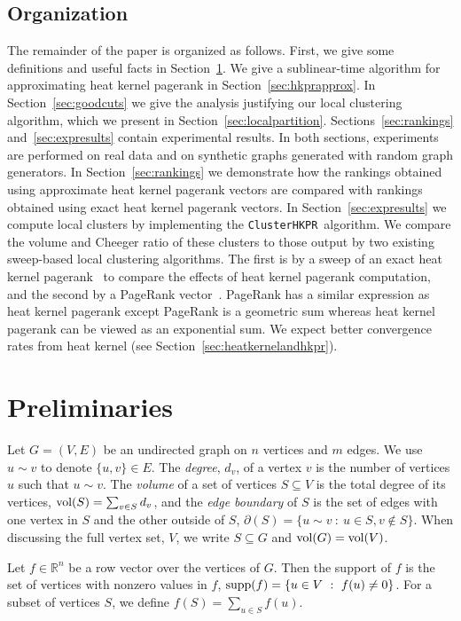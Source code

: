 \documentclass[runningheads,a4paper]{llncs}
\newcommand{\R}{\mathbb{R}}
\newcommand{\vol}{\textmd{vol}}
\newcommand{\supp}{\textmd{supp}}
\newcommand{\partitionalg}{\texttt{ClusterHKPR}}
\begin{document}
\subsection{Organization}
The remainder of the paper is organized as follows.  First, we give some
definitions and useful facts in Section~\ref{sec:preliminaries}.  We give a
sublinear-time algorithm for approximating heat kernel pagerank in
Section~\ref{sec:hkprapprox}.  In Section~\ref{sec:goodcuts} we give the
analysis justifying our local clustering algorithm, which we present in
Section~\ref{sec:localpartition}.  Sections~\ref{sec:rankings}
and~\ref{sec:expresults} contain experimental results.  In both sections,
experiments are performed on real data and on synthetic graphs generated with
random graph generators.  In Section~\ref{sec:rankings} we demonstrate how the
rankings obtained using approximate heat kernel pagerank vectors are compared
with rankings obtained using exact heat kernel pagerank vectors.  In
Section~\ref{sec:expresults} we compute local clusters by implementing the
\partitionalg~algorithm.  We compare the volume and Cheeger ratio of these
clusters to those output by two existing sweep-based local clustering
algorithms.  The first is by a sweep of an exact heat kernel
pagerank~\cite{chung:partitionhkpr:im09} to compare the effects of heat kernel
pagerank computation, and the second by a PageRank
vector~\cite{acl:prgraphpartition:focs06}.  PageRank has a similar expression as
heat kernel pagerank except PageRank is a geometric sum whereas heat kernel
pagerank can be viewed as an exponential sum.  We expect better convergence
rates from heat kernel (see Section~\ref{sec:heatkernelandhkpr}).

\section{Preliminaries}
\label{sec:preliminaries}
Let $G = (V,E)$ be an undirected graph on $n$ vertices and $m$ edges.  We use $u
\sim v$ to denote $\{u,v\} \in E$.  The \emph{degree}, $d_v$, of a vertex $v$ is
the number of vertices $u$ such that $u\sim v$.  The \emph{volume} of a set of
vertices $S \subseteq V$ is the total degree of its vertices, $\vol(S) = \sum_{v
\in S} d_v$, and the \emph{edge boundary} of $S$ is the set of edges with one
vertex in $S$ and the other outside of $S$, $\partial(S) = \{ u\sim v ~:~ u \in
S, v \notin S \}$. When discussing the full vertex set, $V$, we write
$S\subseteq G$ and $\vol(G) = \vol(V)$.

Let $f\in \R^n$ be a row vector over the vertices of $G$.  Then the support of
$f$ is the set of vertices with nonzero values in $f$, $\supp(f) = \{u \in V~:~
f(u)\neq 0\}$.  For a subset of vertices $S$, we define $f(S) = \sum_{u\in S}
f(u)$.
\end{document}
